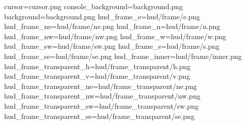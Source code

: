 cursor=cursor.png
console_background=background.png
background=background.png
hud_frame_e=hud/frame/e.png
hud_frame_ne=hud/frame/ne.png
hud_frame_n=hud/frame/n.png
hud_frame_nw=hud/frame/nw.png
hud_frame_w=hud/frame/w.png
hud_frame_sw=hud/frame/sw.png
hud_frame_s=hud/frame/s.png
hud_frame_se=hud/frame/se.png
hud_frame_inner=hud/frame/inner.png
hud_frame_transparent_h=hud/frame_transparent/h.png
hud_frame_transparent_v=hud/frame_transparent/v.png
hud_frame_transparent_ne=hud/frame_transparent/ne.png
hud_frame_transparent_nw=hud/frame_transparent/nw.png
hud_frame_transparent_sw=hud/frame_transparent/sw.png
hud_frame_transparent_se=hud/frame_transparent/se.png
